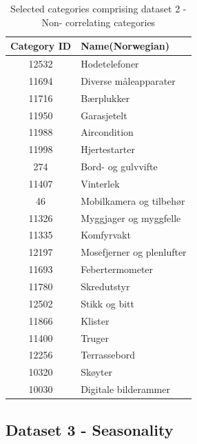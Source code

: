 \begin{table}[H]
  \centering
  \caption{Selected categories comprising dataset 2 - Non- correlating categories}
  \label{table:dataset2}
  \begin{tabular}{|c|l|}\hline
    Category ID & Name(Norwegian)           \\ \hline
    12532       & Hodetelefoner             \\ \hline
    11694       & Diverse måleapparater     \\ \hline
    11716       & Bærplukker                \\ \hline
    11950       & Garasjetelt               \\ \hline
    11988       & Aircondition              \\ \hline
    11998       & Hjertestarter             \\ \hline
    274         & Bord- og gulvvifte        \\ \hline
    11407       & Vinterlek                 \\ \hline
    46          & Mobilkamera og tilbehør   \\ \hline
    11326       & Myggjager og myggfelle    \\ \hline
    11335       & Komfyrvakt                \\ \hline
    12197       & Mosefjerner og plenlufter \\ \hline
    11693       & Febertermometer           \\ \hline
    11780       & Skredutstyr               \\ \hline
    12502       & Stikk og bitt             \\ \hline
    11866       & Klister                   \\ \hline
    11400       & Truger                    \\ \hline
    12256       & Terrassebord              \\ \hline
    10320       & Skøyter                   \\ \hline
    10030       & Digitale bilderammer      \\ \hline
  \end{tabular}
\end{table}




\subsection{Dataset 3 - Seasonality}

